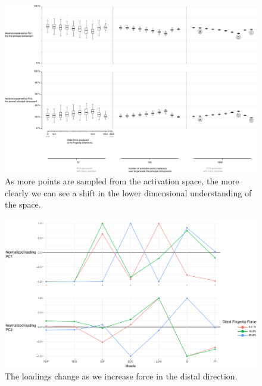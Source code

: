 \documentclass[10pt,letterpaper]{article}
\begin{document}
\begin{figure}[htbp]
\centering
\includegraphics[width=\textwidth]{numbered_figures/figure_7_pca_variance_explained.png}
\caption{As more points are sampled from the activation space, the more clearly we can see a shift in the lower dimensional understanding of the space.}
\label{fig:pca_variance_explained}
\end{figure}
\begin{figure}[htbp]
\centering
\includegraphics[width=\textwidth]{numbered_figures/figure_8_pca_loadings.pdf}
\caption{The loadings change as we increase force in the distal direction.}
\label{fig:pca_loadings}
\end{figure}

\end{document}
